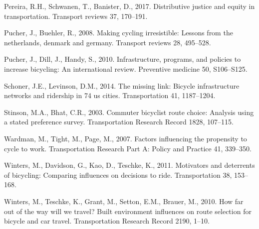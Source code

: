 \documentclass[
]{article}
\begin{document}
\leavevmode\hypertarget{ref-pereira2017distributive}{}%
Pereira, R.H., Schwanen, T., Banister, D., 2017. Distributive justice
and equity in transportation. Transport reviews 37, 170--191.

\leavevmode\hypertarget{ref-pucher2008making}{}%
Pucher, J., Buehler, R., 2008. Making cycling irresistible: Lessons from
the netherlands, denmark and germany. Transport reviews 28, 495--528.

\leavevmode\hypertarget{ref-pucher2010infrastructure}{}%
Pucher, J., Dill, J., Handy, S., 2010. Infrastructure, programs, and
policies to increase bicycling: An international review. Preventive
medicine 50, S106--S125.

\leavevmode\hypertarget{ref-schoner2014missing}{}%
Schoner, J.E., Levinson, D.M., 2014. The missing link: Bicycle
infrastructure networks and ridership in 74 us cities. Transportation
41, 1187--1204.

\leavevmode\hypertarget{ref-stinson2003commuter}{}%
Stinson, M.A., Bhat, C.R., 2003. Commuter bicyclist route choice:
Analysis using a stated preference survey. Transportation Research
Record 1828, 107--115.

\leavevmode\hypertarget{ref-wardman2007factors}{}%
Wardman, M., Tight, M., Page, M., 2007. Factors influencing the
propensity to cycle to work. Transportation Research Part A: Policy and
Practice 41, 339--350.

\leavevmode\hypertarget{ref-winters2011motivators}{}%
Winters, M., Davidson, G., Kao, D., Teschke, K., 2011. Motivators and
deterrents of bicycling: Comparing influences on decisions to ride.
Transportation 38, 153--168.

\leavevmode\hypertarget{ref-winters2010far}{}%
Winters, M., Teschke, K., Grant, M., Setton, E.M., Brauer, M., 2010. How
far out of the way will we travel? Built environment influences on route
selection for bicycle and car travel. Transportation Research Record
2190, 1--10.
\end{document}
